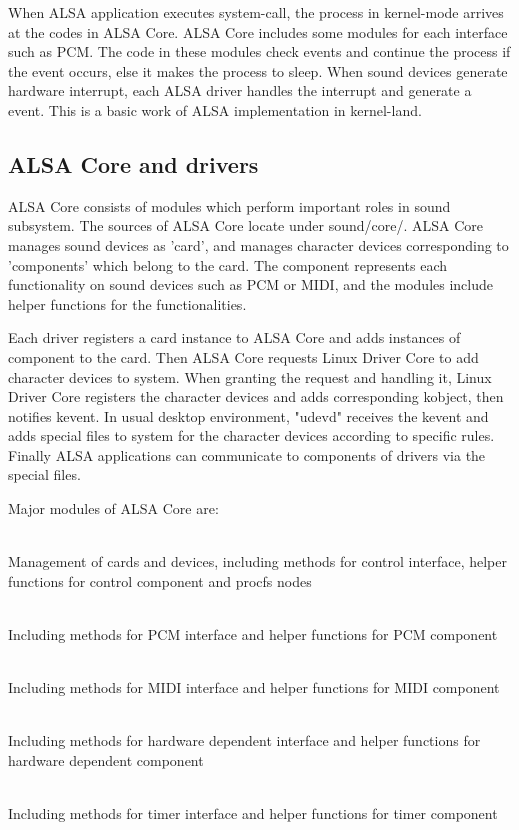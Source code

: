 \documentclass[onecolumn]{article}
\begin{document}
When ALSA application executes system-call, the process in kernel-mode arrives at the codes in ALSA Core. ALSA Core includes some modules for each interface such as PCM. The code in these modules check events and continue the process if the event occurs, else it makes the process to sleep. When sound devices generate hardware interrupt, each ALSA driver handles the interrupt and generate a event. This is a basic work of ALSA implementation in kernel-land.

\subsection{ALSA Core and drivers}

ALSA Core consists of modules which perform important roles in sound subsystem. The sources of ALSA Core locate under sound/core/. ALSA Core manages sound devices as 'card', and manages character devices corresponding to 'components' which belong to the card\cite{alsa-driver}. The component represents each functionality on sound devices such as PCM or MIDI, and the modules include helper functions for the functionalities.

Each driver registers a card instance to ALSA Core and adds instances of component to the card. Then ALSA Core requests Linux Driver Core to add character devices to system. When granting the request and handling it, Linux Driver Core registers the character devices and adds corresponding kobject, then notifies kevent. In usual desktop environment, "udevd" receives the kevent and adds special files to system for the character devices according to specific rules. Finally ALSA applications can communicate to components of drivers via the special files.

Major modules of ALSA Core are:

\begin{description}
\small
\item[snd] \mbox{} \\
Management of cards and devices, including methods for control interface, helper functions for control component and procfs nodes
\item[snd\_pcm] \mbox{} \\
Including methods for PCM interface and helper functions for PCM component
\item[snd\_rawmidi] \mbox{} \\
Including methods for MIDI interface and helper functions for MIDI component
\item[snd\_hwdep] \mbox{} \\
Including methods for hardware dependent interface and helper functions for hardware dependent component
\item[snd\_timer] \mbox{} \\
Including methods for timer interface and helper functions for timer component
\end{description}
\end{document}
